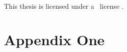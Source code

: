 \documentclass[nopalatino,nolot,nolof,color]{fithesis3}
\begin{document}
 \makeatletter
  \thesis@blocks@cover
  \thesis@blocks@titlePage
  \thesis@blocks@frontMatter
  \begin{center}
    \begin{minipage}{\textwidth}
      This thesis is licensed under a \doclicenseLongNameRef~license \doclicenseIcon.%
    \end{minipage}
  \end{center}
  \thesis@blocks@assignment
  \thesis@blocks@declaration
  \thesis@blocks@thanks
  \thesis@blocks@clearRight
  \thesis@blocks@abstract
  \thesis@blocks@keywords
  \thesis@blocks@tables
  \thesis@blocks@mainMatter
 \makeatother

 
 
 
 
 

 
 

 \appendix
 \chapter{Appendix One}
 \lipsum[1]

 \todos
\end{document}
